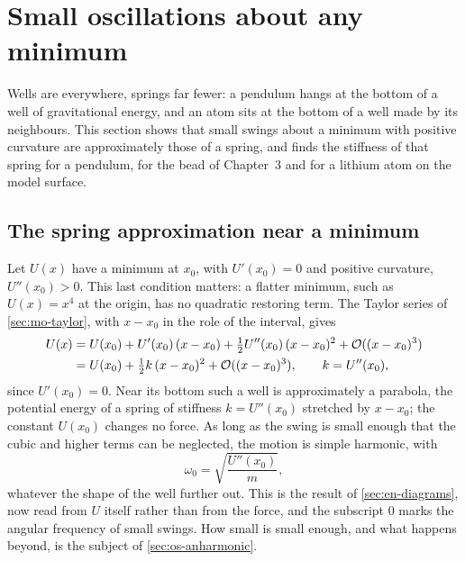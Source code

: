 \section{Small oscillations about any minimum}
\label{sec:os-small}

Wells are everywhere, springs far fewer: a pendulum hangs at
the bottom of a well of gravitational energy, and an atom sits at the
bottom of a well made by its neighbours. This section shows that small
swings about a minimum with positive curvature are approximately those
of a spring, and finds the stiffness
of that spring for a pendulum, for the bead of Chapter~3 and for a lithium
atom on the model surface.

\subsection*{The spring approximation near a minimum}

Let $U(x)$ have a minimum at $x_0$, with $U'(x_0) = 0$ and positive curvature,
$U''(x_0) > 0$. This last condition matters: a flatter minimum, such as
$U(x) = x^4$ at the origin, has no quadratic restoring term. The Taylor series of \cref{sec:mo-taylor}, with $x - x_0$ in the role
of the interval, gives
\begin{align*}
   U(x) &= U(x_0) + U'(x_0)\,(x - x_0) + \tfrac12 U''(x_0)\,(x - x_0)^2
      + \mathcal{O}((x - x_0)^3)\\
   &= U(x_0) + \tfrac12 k\,(x - x_0)^2 + \mathcal{O}((x - x_0)^3) ,
      \qquad k = U''(x_0) ,
\end{align*}
since $U'(x_0) = 0$. Near its bottom such a well is approximately a parabola, the
potential energy of a spring of stiffness $k = U''(x_0)$ stretched by $x -
x_0$; the constant $U(x_0)$ changes no force. As long as the swing is small
enough that the cubic and higher terms can be neglected, the motion is
simple harmonic, with
\begin{equation}
   \omega_0 = \sqrt{\frac{U''(x_0)}{m}} ,
   \label{eq:os-small}
\end{equation}
whatever the shape of the well further out. This is the result of
\cref{sec:en-diagrams}, now read from $U$ itself rather than from the
force, and the subscript 0 marks the angular frequency of small swings. How small is small enough, and what happens beyond, is the
subject of \cref{sec:os-anharmonic}.

